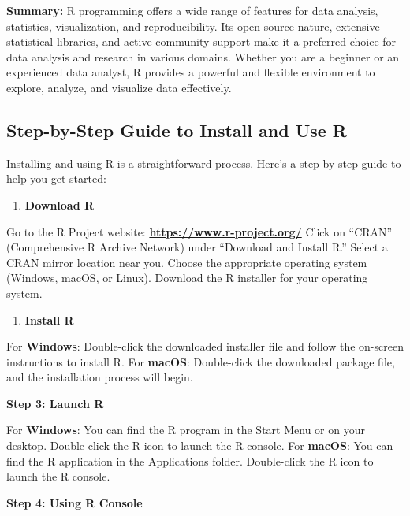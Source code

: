 \documentclass[
]{article}
\providecommand{\tightlist}{%
  \setlength{\itemsep}{0pt}\setlength{\parskip}{0pt}}
\begin{document}
\textbf{Summary:} R programming offers a wide range of features for data
analysis, statistics, visualization, and reproducibility. Its
open-source nature, extensive statistical libraries, and active
community support make it a preferred choice for data analysis and
research in various domains. Whether you are a beginner or an
experienced data analyst, R provides a powerful and flexible environment
to explore, analyze, and visualize data effectively.

\hypertarget{step-by-step-guide-to-install-and-use-r}{%
\subsection{Step-by-Step Guide to Install and Use
R}\label{step-by-step-guide-to-install-and-use-r}}

Installing and using R is a straightforward process. Here's a
step-by-step guide to help you get started:

\begin{enumerate}
\def\labelenumi{\arabic{enumi}.}
\tightlist
\item
  \textbf{Download R}
\end{enumerate}

Go to the R Project website: \textbf{\url{https://www.r-project.org/}}
Click on ``CRAN'' (Comprehensive R Archive Network) under ``Download and
Install R.'' Select a CRAN mirror location near you. Choose the
appropriate operating system (Windows, macOS, or Linux). Download the R
installer for your operating system.

\begin{enumerate}
\def\labelenumi{\arabic{enumi}.}
\setcounter{enumi}{1}
\tightlist
\item
  \textbf{Install R}
\end{enumerate}

For \textbf{Windows}: Double-click the downloaded installer file and
follow the on-screen instructions to install R. For \textbf{macOS}:
Double-click the downloaded package file, and the installation process
will begin.

\textbf{Step 3: Launch R}

For \textbf{Windows}: You can find the R program in the Start Menu or on
your desktop. Double-click the R icon to launch the R console. For
\textbf{macOS}: You can find the R application in the Applications
folder. Double-click the R icon to launch the R console.

\textbf{Step 4: Using R Console}
\end{document}

